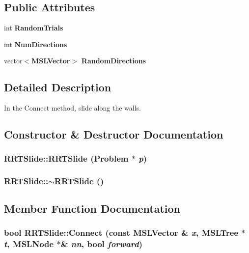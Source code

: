 \subsection*{Public Attributes}
\begin{CompactItemize}
\item 
int {\bf Random\-Trials}
\item 
int {\bf Num\-Directions}
\item 
vector$<${\bf MSLVector}$>$ {\bf Random\-Directions}
\end{CompactItemize}


\subsection{Detailed Description}
In the Connect method, slide along the walls.



\subsection{Constructor \& Destructor Documentation}
\subsubsection{\setlength{\rightskip}{0pt plus 5cm}RRTSlide::RRTSlide ({\bf Problem} $\ast$ {\em p})}\label{class_RRTSlide_a0}


\subsubsection{\setlength{\rightskip}{0pt plus 5cm}RRTSlide::$\sim$RRTSlide ()\hspace{0.3cm}{\tt  [inline, virtual]}}\label{class_RRTSlide_a1}




\subsection{Member Function Documentation}
\subsubsection{\setlength{\rightskip}{0pt plus 5cm}bool RRTSlide::Connect (const {\bf MSLVector} \& {\em x}, {\bf MSLTree} $\ast$ {\em t}, {\bf MSLNode} $\ast$\& {\em nn}, bool {\em forward})\hspace{0.3cm}{\tt  [virtual]}}\label{class_RRTSlide_a3}


